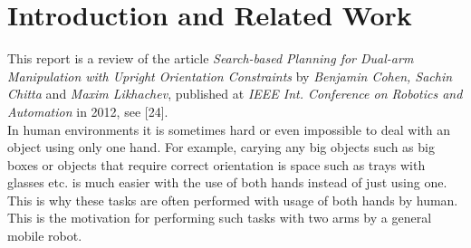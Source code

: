 \documentclass[11pt]{article}
\begin{document}
\section{Introduction and Related Work}
This report is  a review of the article \emph{Search-based Planning for Dual-arm Manipulation with Upright Orientation Constraints} by \emph{Benjamin Cohen, Sachin Chitta} and \emph{Maxim Likhachev}, published at \emph{IEEE Int. Conference on Robotics and Automation} in 2012, see [24].\\
In human environments it is sometimes hard or even impossible to deal with an object using only one hand. For example, carying any big objects such as big boxes or objects that require correct orientation is space such as trays with glasses etc. is much easier with the use of both hands instead of just using one. This is why these tasks are often performed with usage of both hands by human. This is the motivation for performing such tasks with two arms by a general mobile robot.\\
\end{document}
